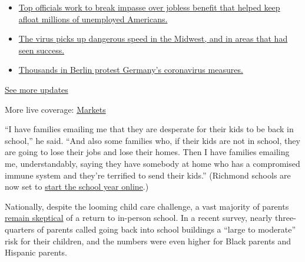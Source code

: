 \begin{itemize}
\tightlist
\item
  \href{https://www.nytimes.com/2020/08/01/world/coronavirus-covid-19.html?action=click\&pgtype=Article\&state=default\&region=MAIN_CONTENT_1\&context=storylines_live_updates\#link-2e88f231}{Top
  officials work to break impasse over jobless benefit that helped keep
  afloat millions of unemployed Americans.}
\item
  \href{https://www.nytimes.com/2020/08/01/world/coronavirus-covid-19.html?action=click\&pgtype=Article\&state=default\&region=MAIN_CONTENT_1\&context=storylines_live_updates\#link-8796723}{The
  virus picks up dangerous speed in the Midwest, and in areas that had
  seen success.}
\item
  \href{https://www.nytimes.com/2020/08/01/world/coronavirus-covid-19.html?action=click\&pgtype=Article\&state=default\&region=MAIN_CONTENT_1\&context=storylines_live_updates\#link-25930521}{Thousands
  in Berlin protest Germany's coronavirus measures.}
\end{itemize}

\href{https://www.nytimes.com/2020/08/01/world/coronavirus-covid-19.html?action=click\&pgtype=Article\&state=default\&region=MAIN_CONTENT_1\&context=storylines_live_updates}{See
more updates}

More live coverage:
\href{https://www.nytimes.com/live/2020/07/31/business/stock-market-today-coronavirus?action=click\&pgtype=Article\&state=default\&region=MAIN_CONTENT_1\&context=storylines_live_updates}{Markets}

``I have families emailing me that they are desperate for their kids to
be back in school,'' he said. ``And also some families who, if their
kids are not in school, they are going to lose their jobs and lose their
homes. Then I have families emailing me, understandably, saying they
have somebody at home who has a compromised immune system and they're
terrified to send their kids.'' (Richmond schools are now set to
\href{https://richmond.com/news/local/richmond-public-schools-will-have-fully-virtual-learning-in-the-fall-because-of-covid-19/article_bcfe040f-7aa5-5c5b-b93a-feeeee56291e.html}{start
the school year online}.)

Nationally, despite the looming child care challenge, a vast majority of
parents
\href{https://www.chalkbeat.org/2020/7/14/21324873/school-closure-reopening-parents-surveys}{remain
skeptical} of a return to in-person school. In a recent survey, nearly
three-quarters of parents called going back into school buildings a
``large to moderate'' risk for their children, and the numbers were even
higher for Black parents and Hispanic parents.

